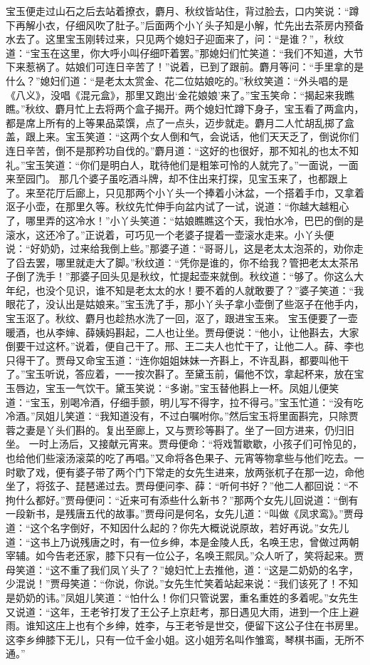\documentclass[12pt,oneside]{book}
\begin{document}
宝玉便走过山石之后去站着撩衣，麝月、秋纹皆站住，背过脸去，口内笑说：“蹲下再解小衣，仔细风吹了肚子。”后面两个小丫头子知是小解，忙先出去茶房内预备水去了。这里宝玉刚转过来，只见两个媳妇子迎面来了，问：“是谁？”，秋纹道：“宝玉在这里，你大呼小叫仔细吓着罢。”那媳妇们忙笑道：“我们不知道，大节下来惹祸了。姑娘们可连日辛苦了！”说着，已到了跟前。麝月等问：“手里拿的是什么？”媳妇们道：“是老太太赏金、花二位姑娘吃的。”秋纹笑道：“外头唱的是《八义》，没唱《混元盒》，那里又跑出‘金花娘娘’来了。”宝玉笑命：“揭起来我瞧瞧。”秋纹、麝月忙上去将两个盒子揭开。两个媳妇忙蹲下身子，宝玉看了两盒内，都是席上所有的上等果品菜馔，点了一点头，迈步就走。麝月二人忙胡乱掷了盒盖，跟上来。宝玉笑道：“这两个女人倒和气，会说话，他们天天乏了，倒说你们连日辛苦，倒不是那矜功自伐的。”麝月道：“这好的也很好，那不知礼的也太不知礼。”宝玉笑道：“你们是明白人，耽待他们是粗笨可怜的人就完了。”一面说，一面来至园门。
那几个婆子虽吃酒斗牌，却不住出来打探，见宝玉来了，也都跟上了。来至花厅后廊上，只见那两个小丫头一个捧着小沐盆，一个搭着手巾，又拿着沤子小壶，在那里久等。秋纹先忙伸手向盆内试了一试，说道：“你越大越粗心了，哪里弄的这冷水！”小丫头笑道：“姑娘瞧瞧这个天，我怕水冷，巴巴的倒的是滚水，这还冷了。”正说着，可巧见一个老婆子提着一壶滚水走来。小丫头便说：“好奶奶，过来给我倒上些。”那婆子道：“哥哥儿，这是老太太泡茶的，劝你走了舀去罢，哪里就走大了脚。”秋纹道：“凭你是谁的，你不给我？管把老太太茶吊子倒了洗手！”那婆子回头见是秋纹，忙提起壶来就倒。秋纹道：“够了。你这么大年纪，也没个见识，谁不知是老太太的水！要不着的人就敢要了？”婆子笑道：“我眼花了，没认出是姑娘来。”宝玉洗了手，那小丫头子拿小壶倒了些沤子在他手内，宝玉沤了。秋纹、麝月也趁热水洗了一回，沤了，跟进宝玉来。
宝玉便要了一壶暖酒，也从李婶、薛姨妈斟起，二人也让坐。贾母便说：“他小，让他斟去，大家倒要干过这杯。”说着，便自己干了。邢、王二夫人也忙干了，让他二人。薛、李也只得干了。贾母又命宝玉道：“连你姐姐妹妹一齐斟上，不许乱斟，都要叫他干了。”宝玉听说，答应着，一一按次斟了。至黛玉前，偏他不饮，拿起杯来，放在宝玉唇边，宝玉一气饮干。黛玉笑说：“多谢。”宝玉替他斟上一杯。凤姐儿便笑道：“宝玉，别喝冷酒，仔细手颤，明儿写不得字，拉不得弓。”宝玉忙道：“没有吃冷酒。”凤姐儿笑道：“我知道没有，不过白嘱咐你。”然后宝玉将里面斟完，只除贾蓉之妻是丫头们斟的。复出至廊上，又与贾珍等斟了。坐了一回方进来，仍归旧坐。
一时上汤后，又接献元宵来。贾母便命：“将戏暂歇歇，小孩子们可怜见的，也给他们些滚汤滚菜的吃了再唱。”又命将各色果子、元宵等物拿些与他们吃去。一时歇了戏，便有婆子带了两个门下常走的女先生进来，放两张杌子在那一边，命他坐了，将弦子、琵琶递过去。贾母便问李、薛：“听何书好？”他二人都回说：“不拘什么都好。”贾母便问：“近来可有添些什么新书？”那两个女先儿回说道：“倒有一段新书，是残唐五代的故事。”贾母问是何名，女先儿道：“叫做《凤求鸾》。”贾母道：“这个名字倒好，不知因什么起的？你先大概说说原故，若好再说。”女先儿道：“这书上乃说残唐之时，有一位乡绅，本是金陵人氏，名唤王忠，曾做过两朝宰辅。如今告老还家，膝下只有一位公子，名唤王熙凤。”众人听了，笑将起来。贾母笑道：“这不重了我们凤丫头了？”媳妇忙上去推他，道：“这是二奶奶的名字，少混说！”贾母笑道：“你说，你说。”女先生忙笑着站起来说：“我们该死了！不知是奶奶的讳。”凤姐儿笑道：“怕什么！你们只管说罢，重名重姓的多着呢。”女先生又说道：“这年，王老爷打发了王公子上京赶考，那日遇见大雨，进到一个庄上避雨。谁知这庄上也有个乡绅，姓李，与王老爷是世交，便留下这公子住在书房里。这李乡绅膝下无儿，只有一位千金小姐。这小姐芳名叫作雏鸾，琴棋书画，无所不通。”
\end{document}
